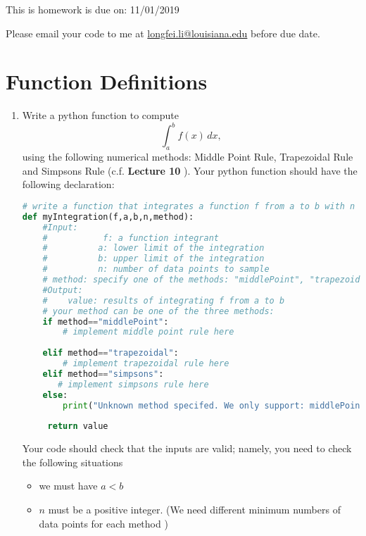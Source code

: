 \documentclass[11pt]{article}
\begin{document}
This is homework is due on: {\color{red}11/01/2019} 


Please email your code to me at \href{mailto:longfei.li@louisiana.edu}{longfei.li@louisiana.edu} before due date. \\

\section{Function Definitions}

 
\begin{enumerate}
\item  Write a {python} function to compute 
$$
\int_a^bf(x)\,dx,
$$
using the following  numerical  methods: Middle Point Rule, Trapezoidal Rule and Simpsons Rule (c.f. {\bf Lecture 10} ).
Your python function should have the following declaration:


\begin{lstlisting}[language=python, caption={myIntegration},label=code:myCode]
# write a function that integrates a function f from a to b with n sample points using a given  method
def myIntegration(f,a,b,n,method):
    #Input:
    #           f: a function integrant
    #          a: lower limit of the integration
    #          b: upper limit of the integration
    #          n: number of data points to sample
    # method: specify one of the methods: "middlePoint", "trapezoidal", "simpsons"
    #Output:
    #    value: results of integrating f from a to b
    # your method can be one of the three methods:
    if method=="middlePoint":
        # implement middle point rule here
        
    elif method=="trapezoidal":
        # implement trapezoidal rule here
    elif method=="simpsons":
       # implement simpsons rule here
    else:
        print("Unknown method specifed. We only support: middlePoint, trapezoidal, simpsons")
        
     return value
\end{lstlisting}  

Your code should check  that the inputs are valid; namely, you need to check the following situations
\begin{itemize}
\item we must have $a<b$
\item $n$ must be a positive integer. (We need different  minimum numbers of data points for each method )
\end{itemize}


\end{enumerate}
\end{document}
